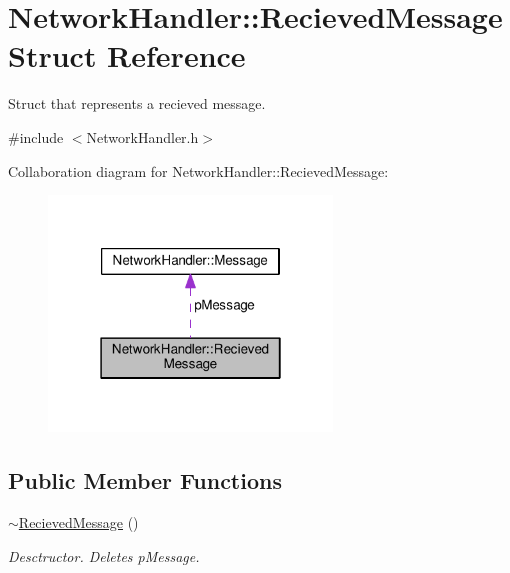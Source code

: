 \hypertarget{structNetworkHandler_1_1RecievedMessage}{}\section{Network\+Handler\+:\+:Recieved\+Message Struct Reference}
\label{structNetworkHandler_1_1RecievedMessage}


Struct that represents a recieved message.  




{\ttfamily \#include $<$Network\+Handler.\+h$>$}



Collaboration diagram for Network\+Handler\+:\+:Recieved\+Message\+:\nopagebreak
\begin{figure}[H]
\begin{center}
\leavevmode
\includegraphics[width=214pt]{structNetworkHandler_1_1RecievedMessage__coll__graph}
\end{center}
\end{figure}
\subsection*{Public Member Functions}
\begin{DoxyCompactItemize}
\item 
\mbox{\label{structNetworkHandler_1_1RecievedMessage_a385c4440196786787b549f03c09811af}} 
\mbox{\hyperlink{structNetworkHandler_1_1RecievedMessage_a385c4440196786787b549f03c09811af}{$\sim$\+Recieved\+Message}} ()
\begin{DoxyCompactList}\small\item\em Desctructor. Deletes p\+Message. \end{DoxyCompactList}\end{DoxyCompactItemize}
